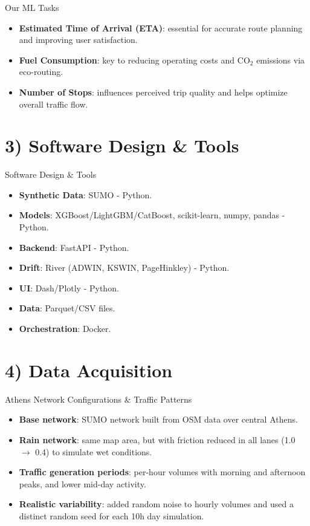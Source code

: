 \documentclass[aspectratio=169]{beamer}
\begin{document}
\begin{frame}{Our ML Tasks}
  \begin{itemize}
    \item \textbf{Estimated Time of Arrival (ETA)}: essential for accurate route planning and improving user satisfaction.
    \item \textbf{Fuel Consumption}: key to reducing operating costs and CO$_2$ emissions via eco-routing.
    \item \textbf{Number of Stops}: influences perceived trip quality and helps optimize overall traffic flow.
  \end{itemize}
\end{frame}

\section{3) Software Design \& Tools}
\begin{frame}{Software Design \& Tools}
  \begin{itemize}
    \item \textbf{Synthetic Data}: SUMO - Python.
    \item \textbf{Models}: XGBoost/LightGBM/CatBoost, scikit-learn, numpy, pandas - Python.
    \item \textbf{Backend}: FastAPI - Python.
    \item \textbf{Drift}: River (ADWIN, KSWIN, PageHinkley) - Python.
    \item \textbf{UI}: Dash/Plotly - Python.
    \item \textbf{Data}: Parquet/CSV files.
    \item \textbf{Orchestration}: Docker.
  \end{itemize}
\end{frame}

\section{4) Data Acquisition}
\begin{frame}{Athens Network Configurations \& Traffic Patterns}
  \begin{itemize}
    \item \textbf{Base network}: SUMO network built from OSM data over central Athens.
    \item \textbf{Rain network}: same map area, but with friction reduced in all lanes (1.0 $\rightarrow$ 0.4) to simulate wet conditions.
    \item \textbf{Traffic generation periods}: per-hour volumes with morning and afternoon peaks, and lower mid-day activity.
    \item \textbf{Realistic variability}: added random noise to hourly volumes and used a distinct random seed for each 10h day simulation.
  \end{itemize}
\end{frame}
\end{document}
